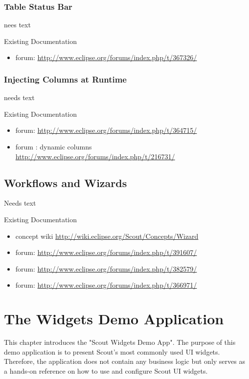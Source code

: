 \documentclass[a4paper,10pt,twoside]{book}
\begin{document}
{\subsection{Table Status Bar}
nees text

\noindent Existing Documentation
\begin{itemize}
  \item forum: \url{http://www.eclipse.org/forums/index.php/t/367326/}
\end{itemize}

\subsection{Injecting Columns at Runtime}
needs text

\noindent Existing Documentation
\begin{itemize}
  \item forum: \url{http://www.eclipse.org/forums/index.php/t/364715/}
  \item forum : dynamic columns \url{http://www.eclipse.org/forums/index.php/t/216731/}
\end{itemize}

\section{Workflows and Wizards}
Needs text

\noindent Existing Documentation
\begin{itemize}
  \item concept wiki \url{http://wiki.eclipse.org/Scout/Concepts/Wizard}
  \item forum: \url{http://www.eclipse.org/forums/index.php/t/391607/}
  \item forum: \url{http://www.eclipse.org/forums/index.php/t/382579/}
  \item forum: \url{http://www.eclipse.org/forums/index.php/t/366971/}
\end{itemize}

\chapter{The Widgets Demo Application}

This chapter introduces the "Scout Widgets Demo App".
The purpose of this demo application is to present Scout's most commonly used UI widgets. 
Therefore, the application does not contain any business logic but only serves as a hands-on reference on how to use and configure Scout UI widgets.

}
\end{document}
